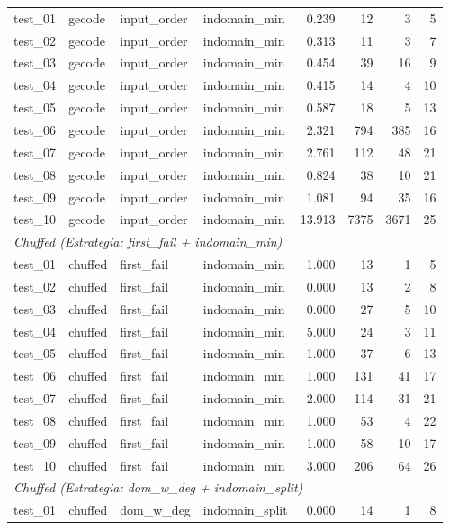 \begin{longtable}{l l l l r r r r}
\midrule
test\_01 & gecode & input\_order & indomain\_min & 0.239 & 12 & 3 & 5 \\
test\_02 & gecode & input\_order & indomain\_min & 0.313 & 11 & 3 & 7 \\
test\_03 & gecode & input\_order & indomain\_min & 0.454 & 39 & 16 & 9 \\
test\_04 & gecode & input\_order & indomain\_min & 0.415 & 14 & 4 & 10 \\
test\_05 & gecode & input\_order & indomain\_min & 0.587 & 18 & 5 & 13 \\
test\_06 & gecode & input\_order & indomain\_min & 2.321 & 794 & 385 & 16 \\
test\_07 & gecode & input\_order & indomain\_min & 2.761 & 112 & 48 & 21 \\
test\_08 & gecode & input\_order & indomain\_min & 0.824 & 38 & 10 & 21 \\
test\_09 & gecode & input\_order & indomain\_min & 1.081 & 94 & 35 & 16 \\
test\_10 & gecode & input\_order & indomain\_min & 13.913 & 7375 & 3671 & 25 \\
\midrule
\multicolumn{8}{l}{\textit{Chuffed (Estrategia: first\_fail + indomain\_min)}} \\
\midrule
test\_01 & chuffed & first\_fail & indomain\_min & 1.000 & 13 & 1 & 5 \\
test\_02 & chuffed & first\_fail & indomain\_min & 0.000 & 13 & 2 & 8 \\
test\_03 & chuffed & first\_fail & indomain\_min & 0.000 & 27 & 5 & 10 \\
test\_04 & chuffed & first\_fail & indomain\_min & 5.000 & 24 & 3 & 11 \\
test\_05 & chuffed & first\_fail & indomain\_min & 1.000 & 37 & 6 & 13 \\
test\_06 & chuffed & first\_fail & indomain\_min & 1.000 & 131 & 41 & 17 \\
test\_07 & chuffed & first\_fail & indomain\_min & 2.000 & 114 & 31 & 21 \\
test\_08 & chuffed & first\_fail & indomain\_min & 1.000 & 53 & 4 & 22 \\
test\_09 & chuffed & first\_fail & indomain\_min & 1.000 & 58 & 10 & 17 \\
test\_10 & chuffed & first\_fail & indomain\_min & 3.000 & 206 & 64 & 26 \\
\midrule
\multicolumn{8}{l}{\textit{Chuffed (Estrategia: dom\_w\_deg + indomain\_split)}} \\
\midrule
test\_01 & chuffed & dom\_w\_deg & indomain\_split & 0.000 & 14 & 1 & 8 \\

\end{longtable}
